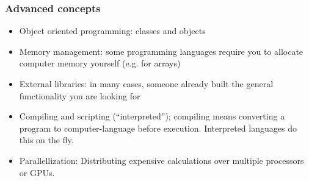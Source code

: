 \begin{frame}
  \frametitle{Advanced concepts}
  \begin{itemize}
    \item Object oriented programming: classes and objects
    \item Memory management: some programming languages require you to allocate computer memory yourself (e.g. for arrays)
    \item External libraries: in many cases, someone already built the general functionality you are looking for
    \item Compiling and scripting (``interpreted''); compiling means converting a program to computer-language before execution. Interpreted languages do this on the fly.
    \item Parallellization: Distributing expensive calculations over multiple processors or GPUs.
  \end{itemize}\pause
 \end{frame}